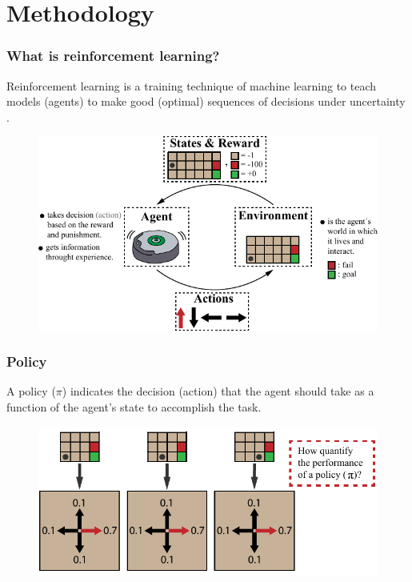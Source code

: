 \graphicspath{{images/methodology/}}
\section{Methodology}
\begin{frame}
	\frametitle{What is reinforcement learning?}
	Reinforcement learning is a training technique of machine learning to teach models {\color{gray} (agents)} to make good {\color{gray} (optimal)} sequences of decisions under uncertainty \footnotemark[1].
	
	\begin{figure}
		\includegraphics{reinforcement_learning_diagram.pdf}
	\end{figure}

\end{frame}


\begin{frame}
	\frametitle{Policy}
	A policy ($\pi$) indicates the decision {\color{gray} (action)} that the agent should take as a function of the agent's state to accomplish the task\footnotemark[1].%
	
	\begin{figure}
		\includegraphics{policy_stochastic.pdf}
	\end{figure}
	
\end{frame}




